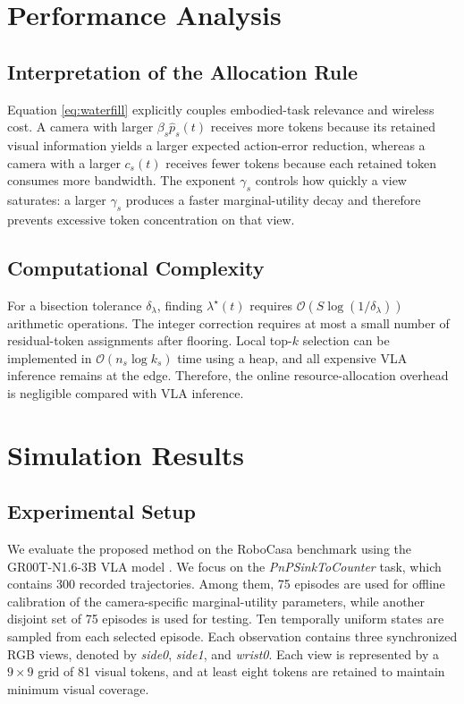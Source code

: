 \documentclass[lettersize,journal]{IEEEtran}
\theoremstyle{custom}
\begin{document}
\section{Performance Analysis}
\subsection{Interpretation of the Allocation Rule}
Equation \eqref{eq:waterfill} explicitly couples embodied-task relevance and wireless cost. A camera with larger $\beta_s\widehat p_s(t)$ receives more tokens because its retained visual information yields a larger expected action-error reduction, whereas a camera with a larger $c_s(t)$ receives fewer tokens because each retained token consumes more bandwidth. The exponent $\gamma_s$ controls how quickly a view saturates: a larger $\gamma_s$ produces a faster marginal-utility decay and therefore prevents excessive token concentration on that view.

\subsection{Computational Complexity}
For a bisection tolerance $\delta_\lambda$, finding $\lambda^\star(t)$ requires $\mathcal O(S\log(1/\delta_\lambda))$ arithmetic operations. The integer correction requires at most a small number of residual-token assignments after flooring. Local top-$k$ selection can be implemented in $\mathcal O(n_s\log k_s)$ time using a heap, and all expensive VLA inference remains at the edge. Therefore, the online resource-allocation overhead is negligible compared with VLA inference.

\section{Simulation Results}

\subsection{Experimental Setup}

We evaluate the proposed method on the RoboCasa benchmark
\cite{robocasa2024} using the GR00T-N1.6-3B VLA model
\cite{nvidia_gr00t_2025}. We focus on the
\emph{PnPSinkToCounter} task, which contains 300 recorded
trajectories. Among them, 75 episodes are used for offline calibration
of the camera-specific marginal-utility parameters, while another
disjoint set of 75 episodes is used for testing. Ten temporally uniform
states are sampled from each selected episode. Each observation contains
three synchronized RGB views, denoted by \emph{side0}, \emph{side1},
and \emph{wrist0}. Each view is represented by a $9\times9$ grid of
81 visual tokens, and at least eight tokens are retained to maintain
minimum visual coverage.
\end{document}
